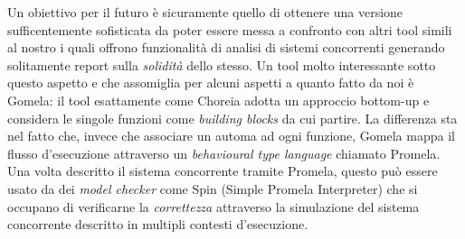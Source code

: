 Un obiettivo per il futuro è sicuramente quello di ottenere una versione sufficentemente sofisticata da poter essere messa a confronto con altri tool simili al nostro i quali offrono funzionalità di analisi di sistemi concorrenti generando solitamente report sulla \emph{solidità} dello stesso. Un tool molto interessante sotto questo aspetto e che assomiglia per alcuni aspetti a quanto fatto da noi è Gomela\cite{Gomela}: il tool esattamente come Choreia adotta un approccio bottom-up e considera le singole funzioni come \emph{building blocks} da cui partire. La differenza sta nel fatto che, invece che associare un automa ad ogni funzione, Gomela mappa il flusso d'esecuzione attraverso un \emph{behavioural type language} chiamato Promela\cite{Promela}. Una volta descritto il sistema concorrente tramite Promela, questo può essere usato da dei \emph{model checker} come Spin\cite{Spin} (Simple Promela Interpreter) che si occupano di verificarne la \emph{correttezza} attraverso la simulazione del sistema concorrente descritto in multipli contesti d'esecuzione.